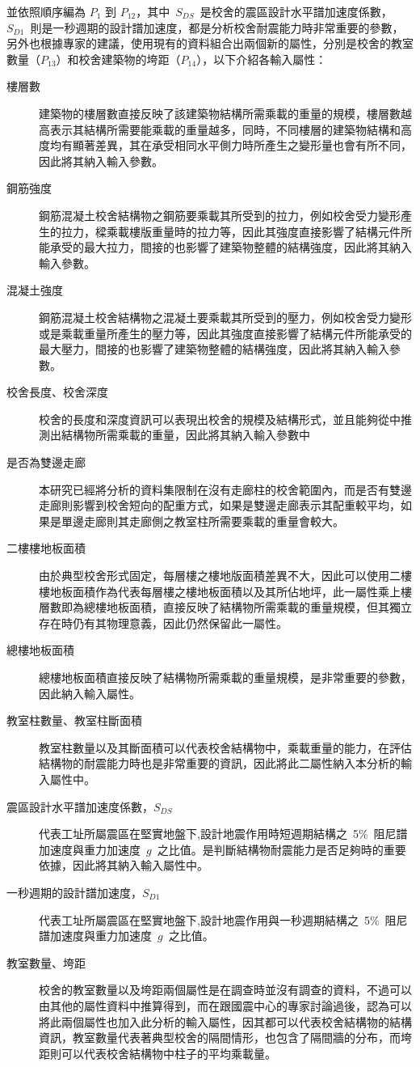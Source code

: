 並依照順序編為 $P_1$ 到 $P_{12}$，其中~$S_{DS}$~是校舍的震區設計水平譜加速度係數，~$S_{D1}$~則是一秒週期的設計譜加速度，都是分析校舍耐震能力時非常重要的參數，另外也根據專家的建議，使用現有的資料組合出兩個新的屬性，分別是校舍的教室數量（$P_{13}$）和校舍建築物的垮距（$P_{14}$），以下介紹各輸入屬性：

\begin{description}
  \item[樓層數]
  建築物的樓層數直接反映了該建築物結構所需乘載的重量的規模，樓層數越高表示其結構所需要能乘載的重量越多，同時，不同樓層的建築物結構和高度均有顯著差異，其在承受相同水平側力時所產生之變形量也會有所不同，因此將其納入輸入參數。
  \item[鋼筋強度]
  鋼筋混凝土校舍結構物之鋼筋要乘載其所受到的拉力，例如校舍受力變形產生的拉力，樑乘載樓版重量時的拉力等，因此其強度直接影響了結構元件所能承受的最大拉力，間接的也影響了建築物整體的結構強度，因此將其納入輸入參數。
  \item[混凝土強度]
  鋼筋混凝土校舍結構物之混凝土要乘載其所受到的壓力，例如校舍受力變形或是乘載重量所產生的壓力等，因此其強度直接影響了結構元件所能承受的最大壓力，間接的也影響了建築物整體的結構強度，因此將其納入輸入參數。
  \item[校舍長度、校舍深度]
  校舍的長度和深度資訊可以表現出校舍的規模及結構形式，並且能夠從中推測出結構物所需乘載的重量，因此將其納入輸入參數中
  \item[是否為雙邊走廊]
  本研究已經將分析的資料集限制在沒有走廊柱的校舍範圍內，而是否有雙邊走廊則影響到校舍短向的配重方式，如果是雙邊走廊表示其配重較平均，如果是單邊走廊則其走廊側之教室柱所需要乘載的重量會較大。
  \item[二樓樓地板面積]
  由於典型校舍形式固定，每層樓之樓地版面積差異不大，因此可以使用二樓樓地板面積作為代表每層樓之樓地板面積以及其所佔地坪，此一屬性乘上樓層數即為總樓地板面積，直接反映了結構物所需乘載的重量規模，但其獨立存在時仍有其物理意義，因此仍然保留此一屬性。
  \item[總樓地板面積]
  總樓地板面積直接反映了結構物所需乘載的重量規模，是非常重要的參數，因此納入輸入屬性。
  \item[教室柱數量、教室柱斷面積]
  教室柱數量以及其斷面積可以代表校舍結構物中，乘載重量的能力，在評估結構物的耐震能力時也是非常重要的資訊，因此將此二屬性納入本分析的輸入屬性中。
  \item[震區設計水平譜加速度係數，$S_{DS}$]
  代表工址所屬震區在堅實地盤下,設計地震作用時短週期結構之~5\%~阻尼譜加速度與重力加速度~$g$~之比值。是判斷結構物耐震能力是否足夠時的重要依據，因此將其納入輸入屬性中。
  \item[一秒週期的設計譜加速度，$S_{D1}$]
  代表工址所屬震區在堅實地盤下,設計地震作用與一秒週期結構之~5\%~阻尼譜加速度與重力加速度~$g$~之比值。
  \item[教室數量、垮距]
  校舍的教室數量以及垮距兩個屬性是在調查時並沒有調查的資料，不過可以由其他的屬性資料中推算得到，而在跟國震中心的專家討論過後，認為可以將此兩個屬性也加入此分析的輸入屬性，因其都可以代表校舍結構物的結構資訊，教室數量代表著典型校舍的隔間情形，也包含了隔間牆的分布，而垮距則可以代表校舍結構物中柱子的平均乘載量。
\end{description}


